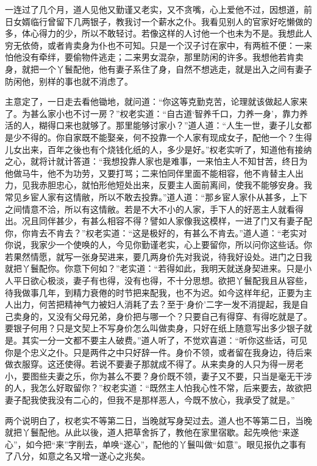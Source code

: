 \documentclass[a4paper,12pt,UTF8,twoside]{ctexbook}
\begin{document}
一连过了几个月，道人见他又勤谨又老实，又不贪嘴，心上爱他不过，因想道，前日女婿临行曾留下几两银子，教我讨一个薪水之仆。我看见别人的官家好吃懒做的多，体心得力的少，所以不敢轻讨。若像这样的人讨他一个也未为不是。我想此人穷无依倚，或者肯卖身为仆也不可知。只是一个汉子讨在家中，有两桩不便：一来怕他没有牵绊，要偷物件逃走；二来男女混杂，那里防闲的许多。我想他若肯卖身，就把一个丫鬟配他，他有妻子系住了身，自然不想逃走，就是出入之间有妻子防闲他，别样的事也就不消虑了。

主意定了，一日走去看他锄地，就问道：“你这等克勤克苦，论理就该做起人家来了。为甚么家小也不讨一房？”权老实道：“自古道‘智养千口，力养一身’，靠力养活的人，糊得口来也就够了。那里能够讨家小？”道人道：“人生一世，妻子儿女都是少不得的。你自家既不能娶亲，何不投靠一个人家有现成女子，配他一个？生得儿女出来，百年之後也有个烧钱化纸的人，多少是好。”权老实听了，知道他有接纳之心，就将计就计答道：“我想投靠人家也是难事，一来怕主人不知甘苦，终日为他做马牛，他不为功劳，又要打骂；二来怕同伴里面不能相容，他不肯替主人出力，见我赤胆忠心，就怕形他短处出来，反要主人面前离间，使我不能够安身。我常见乡宦人家有这情敝，所以不敢去投靠。”道人道：“那乡宦人家仆从甚多，上下之间情意不洽，所以有这情敝。若是不大不小的人家，手下人的好恶主人就看得出。况且同伴甚少，有甚么相容不得？譬如人家像我这模样，一进了门又有妻子配你，你肯去不肯去？”权老实道：“这是极好的，有甚么不肯去。”道人道：“老实对你说，我家少一个使唤的人，今见你勤谨老实，心上要留你，所以问你这些话。你若果然情愿，就写一张身契进来，要几两身价先对我说，待我好设处。进门之日我就把丫鬟配你。你意下何如？”老实道：“若得如此，我明天就送身契进来。只是小人平日欲心极淡，妻子有也得，没有也得，不十分思想。欲把丫鬟配我且从容些，待我做事几年，到精力衰倦的时节把来配我，也不为迟。如今这样年纪，正要为主人出力，何苦把精神气力被妇人消耗了去？至于‘身价’二字一发不消提起，我是自己卖身的，又没有父母兄弟，身价把与哪一个？只要自己有得穿、有得吃就是了。要银子何用？只是文契上不写身价怎么叫做卖身，只好在纸上随意写出多少银子就是。其实一分一文都不要主人破费。”道人听了，不觉欢喜道：“听你这些话，可见你是个忠义之仆。只是两件之中只好辞一件。身价不领，或者留在我身边，待后来做衣服穿。这还使得。若说不要妻子那就成不得了。从来卖身的人只为得一房老小，要图些夫妻之乐，你为甚么不要？身价既不领，妻子又不要，只当是毫无干涉的人，我怎么好取留你？”权老实道：“既然主人怕我心性不常，后来要去，故欲把妻子配我使我没有二心的，但我不是那样恶人，今既不放心，我承受了就是。”

两个说明白了，权老实不等第二日，当晚就写身契过去。道人也不等第二日，当晚就把丫鬟配他。从此以後，道人把草舍拆了，教他在家里宿歇。起先唤他“来遂心”，如今把“来”字削去，单唤“遂心”，配他的丫鬟叫做“如意”。眼见报仇之事有了八分，如意之名又增一遂心之兆矣。
\end{document}
